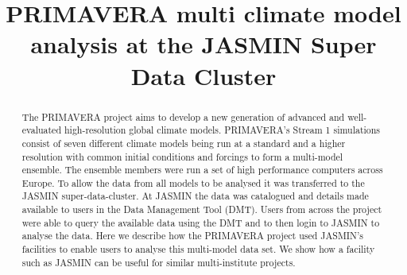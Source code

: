 \documentclass[gmd, manuscript]{copernicus}
\begin{document}
\title{PRIMAVERA multi climate model analysis at the JASMIN Super Data Cluster}













\received{}
\pubdiscuss{} %
\revised{}
\accepted{}
\published{}




\maketitle



\begin{abstract}
The PRIMAVERA project aims to develop a new generation of advanced and well-evaluated high-resolution global climate models. PRIMAVERA's Stream 1 simulations consist of seven different climate models being run at a standard and a higher resolution with common initial conditions and forcings to form a multi-model ensemble. The ensemble members were run a set of high performance computers across Europe. To allow the data from all models to be analysed it was transferred to the JASMIN super-data-cluster. At JASMIN the data was catalogued and details made available to users in the Data Management Tool (DMT). Users from across the project were able to query the available data using the DMT and to then login to JASMIN to analyse the data. Here we describe how the PRIMAVERA project used JASMIN's facilities to enable users to analyse this multi-model data set. We show how a facility such as JASMIN can be useful for similar multi-institute projects.
\end{abstract}
\end{document}
